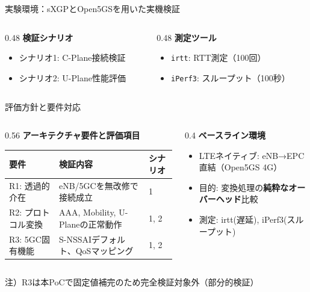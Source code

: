 \documentclass[dvipdfmx,11pt,aspectratio=169]{beamer}
\begin{document}
\begin{frame}{実験環境：sXGPとOpen5GSを用いた実機検証}
  \vspace{0.3cm}
  \begin{columns}[T]
    \begin{column}{0.48\textwidth}
      \textbf{検証シナリオ}
      \begin{itemize}
        \item シナリオ1: C-Plane接続検証
        \item シナリオ2: U-Plane性能評価
      \end{itemize}
    \end{column}
    \begin{column}{0.48\textwidth}
      \textbf{測定ツール}
      \begin{itemize}
        \item \texttt{irtt}: RTT測定（100回）
        \item \texttt{iPerf3}: スループット（100秒）
      \end{itemize}
    \end{column}
  \end{columns}
\end{frame}

\begin{frame}{評価方針と要件対応}
  \begin{columns}[T]
    \begin{column}{0.56\textwidth}
      \textbf{アーキテクチャ要件と評価項目}
      \begin{table}
        \tiny
        \begin{tabular}{|l|p{4.2cm}|l|}
          \hline
          \textbf{要件} & \textbf{検証内容} & \textbf{シナリオ} \\
          \hline
          R1: 透過的介在 & eNB/5GCを無改修で接続成立 & 1 \\
          \hline
          R2: プロトコル変換 & AAA, Mobility, U-Planeの正常動作 & 1, 2 \\
          \hline
          R3: 5GC固有機能 & S-NSSAIデフォルト、QoSマッピング & 1, 2 \\
          \hline
        \end{tabular}
      \end{table}
    \end{column}
    \begin{column}{0.4\textwidth}
      \textbf{ベースライン環境}
      \begin{itemize}
        \item LTEネイティブ: eNB→EPC直結（Open5GS 4G）
        \item 目的: 変換処理の\textbf{純粋なオーバーヘッド}比較
        \item 測定: irtt(遅延), iPerf3(スループット)
      \end{itemize}
    \end{column}
  \end{columns}
  \vspace{0.2cm}
  \scriptsize 注）R3は本PoCで固定値補完のため完全検証対象外（部分的検証）
\end{frame}
\end{document}
